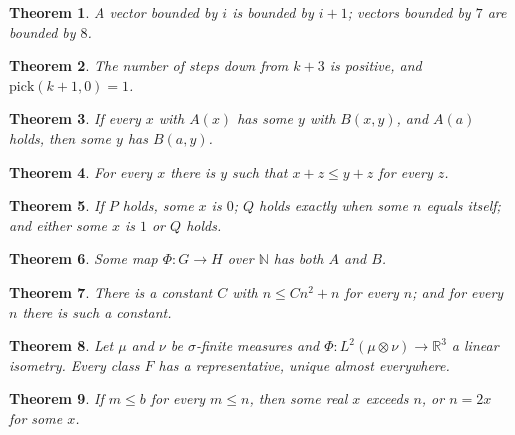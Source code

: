 \documentclass[11pt]{article}
\newtheorem{theorem}{Theorem}
\newcommand{\lean}[1]{}
\begin{document}
\begin{theorem}\label{thm:below}\lean{Shape.below_succ}\lean{Shape.every_below}
A vector bounded by $i$ is bounded by $i + 1$; vectors bounded by $7$ are bounded by $8$.
\end{theorem}

\begin{theorem}\label{thm:steps}\lean{Shape.steps_pos}\lean{Shape.pick_at}
The number of steps down from $k + 3$ is positive, and $\mathrm{pick}(k + 1, 0) = 1$.
\end{theorem}

\begin{theorem}\label{thm:conditional}\lean{Shape.conditional}
If every $x$ with $A(x)$ has some $y$ with $B(x, y)$, and $A(a)$ holds, then some $y$ has
$B(a, y)$.
\end{theorem}

\begin{theorem}\label{thm:alternating}\lean{Shape.alternating}
For every $x$ there is $y$ such that $x + z \le y + z$ for every $z$.
\end{theorem}

\begin{theorem}\label{thm:premised}\lean{Shape.premised}
If $P$ holds, some $x$ is $0$; $Q$ holds exactly when some $n$ equals itself; and either some $x$
is $1$ or $Q$ holds.
\end{theorem}

\begin{theorem}\label{thm:one-map}\lean{Shape.one_map}
Some map $\Phi \colon G \to H$ over $\mathbb{N}$ has both $A$ and $B$.
\end{theorem}

\begin{theorem}\label{thm:bound-once}\lean{Shape.bound_once}\lean{Shape.bound_each}
There is a constant $C$ with $n \le C n^2 + n$ for every $n$; and for every $n$ there is such a
constant.
\end{theorem}

\begin{theorem}\label{thm:isometry}\lean{Shape.isometry_classes}
Let $\mu$ and $\nu$ be $\sigma$-finite measures and $\Phi \colon L^2(\mu \otimes \nu) \to
\mathbb{R}^3$ a linear isometry. Every class $F$ has a representative, unique almost everywhere.
\end{theorem}

\begin{theorem}\label{thm:alternatives}\lean{Shape.alternatives}
If $m \le b$ for every $m \le n$, then some real $x$ exceeds $n$, or $n = 2x$ for some $x$.
\end{theorem}
\end{document}
